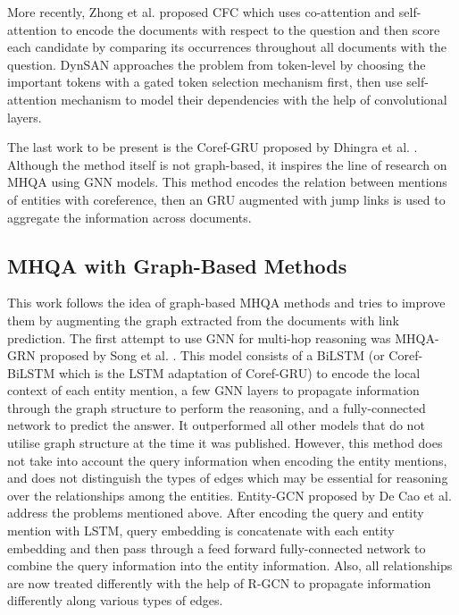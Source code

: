 \documentclass[12pt]{report}
\begin{document}
More recently, Zhong et al. proposed CFC \cite{zhong_coarse-grain_2019} which uses co-attention and self-attention to encode the documents with respect to the question and then score each candidate by comparing its occurrences throughout all documents with the question. DynSAN \cite{zhuang_token-level_2019} approaches the problem from token-level by choosing the important tokens with a gated token selection mechanism first, then use self-attention mechanism to model their dependencies with the help of convolutional layers.

The last work to be present is the Coref-GRU proposed by Dhingra et al. \cite{dhingra_neural_2018}. Although the method itself is not graph-based, it inspires the line of research on MHQA using GNN models. This method encodes the relation between mentions of entities with coreference, then an GRU augmented with jump links is used to aggregate the information across documents.
\subsection{MHQA with Graph-Based Methods}
This work follows the idea of graph-based MHQA methods and tries to improve them by augmenting the graph extracted from the documents with link prediction. The first attempt to use GNN for multi-hop reasoning was MHQA-GRN proposed by Song et al. \cite{song_exploring_2018}. This model consists of a BiLSTM (or Coref-BiLSTM which is the LSTM adaptation of Coref-GRU)
to encode the local context of each entity mention, a few GNN
layers to propagate information through the graph structure to perform the reasoning, and
a fully-connected network to predict the answer. It outperformed all other models that do not utilise graph structure at the time it was published. However, this method does not take into account the query information when encoding the entity mentions, and does not distinguish the types of edges which may be essential for reasoning over the relationships among the entities. Entity-GCN proposed by De Cao et al. \cite{de_cao_question_2019} address the problems mentioned above. After encoding the query and entity mention with LSTM, query embedding is concatenate with each entity embedding and then pass through a feed forward fully-connected network to combine the query information into the entity information. Also, all relationships are now treated differently with the help of R-GCN to propagate information differently along various types of edges.
\end{document}
